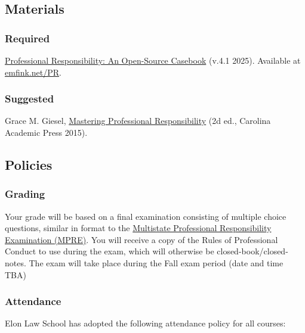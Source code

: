 \documentclass[11pt,letterpaper,twoside]{article}
\begin{document}
\subsection{Materials}\label{materials}

\subsubsection{Required}\label{required}

\href{https://emfink.net/PR}{Professional Responsibility: An Open-Source
Casebook} (v.4.1 2025). Available at
\href{https://www.emfink.net/PR/}{emfink.net/PR}.

\subsubsection{Suggested}\label{suggested}

Grace M. Giesel,
\href{https://cap-press.com/books/isbn/9781611636208/Mastering-Professional-Responsibility-Second-Edition}{Mastering
Professional Responsibility} (2d ed., Carolina Academic Press 2015).

\subsection{Policies}\label{policies}

\subsubsection{Grading}\label{grading}

Your grade will be based on a final examination consisting of multiple
choice questions, similar in format to the
\href{https://www.ncbex.org/exams/mpre}{Multistate Professional
Responsibility Examination (MPRE)}. You will receive a copy of the Rules
of Professional Conduct to use during the exam, which will otherwise be
closed-book/closed-notes. The exam will take place during the Fall exam
period (date and time TBA)

\subsubsection{Attendance}\label{attendance}

Elon Law School has adopted the following attendance policy for all
courses:
\end{document}
